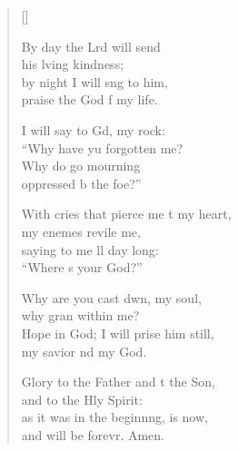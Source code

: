 \begin{verse}[\versewidth]
\begin{patverse}
By day the Lrd will send\Med\\
his lving kindness;\\
by night I will s\pointup{\i}ng to him,\Med\\
praise the God f my life.

I will say to Gd, my rock:\Med\\
“Why have yu forgotten me?\\
Why do  go mourning\Med\\
oppressed b the foe?”

With cries that pierce me t my heart,\Med\\
my enem\pointup{\i}es revile me,\\
saying to me ll day long:\Med\\
“Where \pointup{\i}s your God?”

Why are you cast dwn, my soul,\Med\\
why gran within me?\\
Hope in God; I will prise him still,\Med\\
my savior nd my God.

Glory to the Father and t the Son,\Med\\
and to the Hly Spirit:\\
as it was in the beginn\pointup{\i}ng, is now,\Med\\
and will be forevr. Amen. 
  \end{patverse}
\end{verse}
